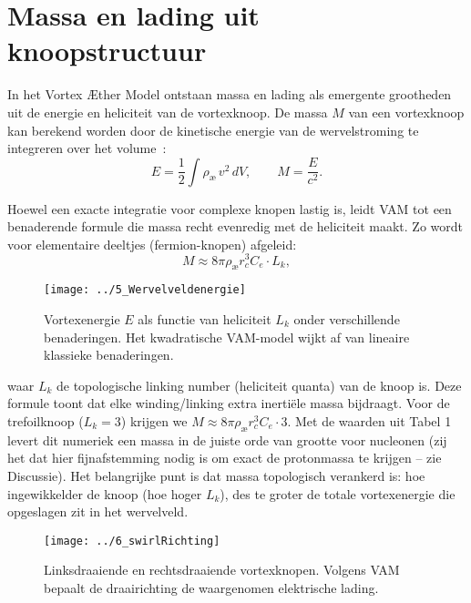 \section{Massa en lading uit knoopstructuur}

In het Vortex Æther Model ontstaan massa en lading als emergente grootheden uit de energie en heliciteit van de vortexknoop. De massa $M$ van een
vortexknoop kan berekend worden door de kinetische energie van de wervelstroming te integreren over het volume~\cite{Moffatt1990VortexHelicity}:
\begin{equation}
    E = \frac{1}{2}\int \rho_\text{\ae}\, v^2 \,dV, \qquad M = \frac{E}{c^2}.
\end{equation}

Hoewel een exacte integratie voor complexe knopen lastig is, leidt VAM tot een benaderende formule die massa recht evenredig met de heliciteit maakt. Zo wordt voor elementaire deeltjes (fermion-knopen) afgeleid:
\begin{equation}
    M \approx 8\pi \rho_\text{\ae} r_c^3 C_e \cdot L_k,
\end{equation}


\begin{figure}[H]
    \centering
    \texttt{[image: ../5\_Wervelveldenergie]}
    \caption{Vortexenergie $E$ als functie van heliciteit $L_k$ onder verschillende benaderingen. Het kwadratische VAM-model wijkt af van lineaire klassieke benaderingen.}
    \label{fig:energie_vs_heliciteit}
\end{figure}

waar $L_k$ de topologische linking number (heliciteit quanta) van de knoop is. Deze formule toont dat elke winding/linking extra inertiële massa bijdraagt. Voor de trefoilknoop ($L_k=3$) krijgen we $M \approx 8\pi \rho_\text{\ae} r_c^3 C_e \cdot 3$. Met de waarden uit Tabel 1 levert dit numeriek een massa in de juiste orde van grootte voor nucleonen (zij het dat hier fijnafstemming nodig is om exact de protonmassa te krijgen – zie Discussie). Het belangrijke punt is dat massa topologisch verankerd is: hoe ingewikkelder de knoop (hoe hoger $L_k$), des te groter de totale vortexenergie die opgeslagen zit in het wervelveld.

\begin{figure}[H]
    \centering
    \texttt{[image: ../6\_swirlRichting]}
    \caption{Linksdraaiende en rechtsdraaiende vortexknopen. Volgens VAM bepaalt de draairichting de waargenomen elektrische lading.}
    \label{fig:swirl_lading}
\end{figure}

